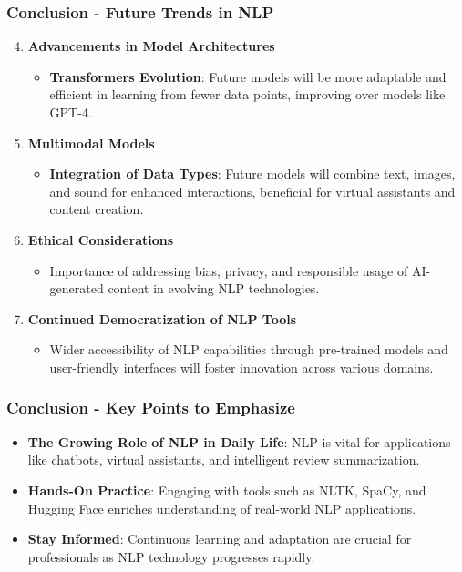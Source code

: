 \documentclass[aspectratio=169]{beamer}
\begin{document}
\begin{frame}[fragile]
    \frametitle{Conclusion - Future Trends in NLP}
    \begin{enumerate}
        \setcounter{enumi}{3}
        \item \textbf{Advancements in Model Architectures}
        \begin{itemize}
            \item \textbf{Transformers Evolution}: Future models will be more adaptable and efficient in learning from fewer data points, improving over models like GPT-4.
        \end{itemize}

        \item \textbf{Multimodal Models}
        \begin{itemize}
            \item \textbf{Integration of Data Types}: Future models will combine text, images, and sound for enhanced interactions, beneficial for virtual assistants and content creation.
        \end{itemize}

        \item \textbf{Ethical Considerations}
        \begin{itemize}
            \item Importance of addressing bias, privacy, and responsible usage of AI-generated content in evolving NLP technologies.
        \end{itemize}

        \item \textbf{Continued Democratization of NLP Tools}
        \begin{itemize}
            \item Wider accessibility of NLP capabilities through pre-trained models and user-friendly interfaces will foster innovation across various domains.
        \end{itemize}
    \end{enumerate}
\end{frame}

\begin{frame}[fragile]
    \frametitle{Conclusion - Key Points to Emphasize}
    \begin{itemize}
        \item \textbf{The Growing Role of NLP in Daily Life}: NLP is vital for applications like chatbots, virtual assistants, and intelligent review summarization.
        \item \textbf{Hands-On Practice}: Engaging with tools such as NLTK, SpaCy, and Hugging Face enriches understanding of real-world NLP applications.
        \item \textbf{Stay Informed}: Continuous learning and adaptation are crucial for professionals as NLP technology progresses rapidly.
    \end{itemize}
\end{frame}
\end{document}
